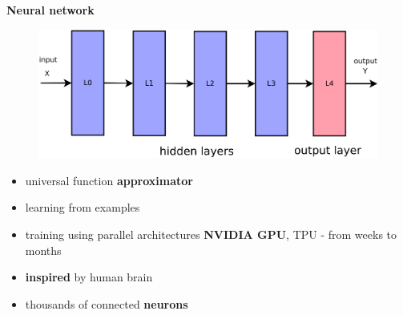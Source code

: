 \documentclass[xcolor=dvipsnames]{beamer}
\begin{document}
\begin{frame}{\bf Neural network}

\begin{figure}
  \includegraphics[scale=0.2]{../../diagrams/nn/nn.png}
\end{figure}


\begin{itemize}
  \item universal function {\bf \color{red} approximator}
  \item learning from examples
  \item training using parallel architectures {\bf \color{red} NVIDIA GPU}, TPU - from weeks to months
  \item {\bf \color{red} inspired} by human brain
  \item thousands of connected {\bf \color{red} neurons}
\end{itemize}


\end{frame}
\end{document}

